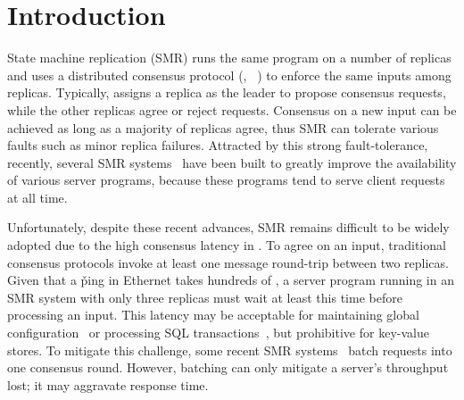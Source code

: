 \section{Introduction} \label{sec:intro}

State machine replication (SMR) runs the same program on a 
number of replicas and uses a distributed consensus protocol (\eg, 
\paxos~\cite{crane:sosp15}) to enforce the same inputs among 
replicas. Typically, \paxos assigns a replica as the leader to propose 
consensus requests, while the other replicas agree or reject requests. 
Consensus on a new input can be achieved as long as a majority of replicas 
agree, thus SMR can tolerate various faults such as minor replica 
failures. Attracted by this strong fault-tolerance, recently, several SMR 
systems~\cite{chubby:osdi, zookeeper, crane:sosp15, eve:osdi12, rex:eurosys14} 
have been built to greatly improve the availability of various server programs, 
because these programs tend to serve client requests at all time.

Unfortunately, despite these recent advances, SMR remains difficult to be 
widely adopted due to the high consensus latency in \paxos. To agree on an 
input, traditional consensus protocols invoke at least one message round-trip 
between two replicas. Given that a \v{ping} in Ethernet takes hundreds of \us, a 
server program running in an SMR system with only three replicas must wait at 
least this time before processing an input. This latency may be acceptable for 
maintaining global configuration~\cite{chubby:osdi,zookeeper} or processing SQL 
transactions~\cite{crane:sosp15,eve:osdi12}, but prohibitive for 
key-value stores. To mitigate this challenge, some recent SMR 
systems~\cite{calvin:sigmod12,rex:eurosys14} batch requests into one 
consensus round. However, batching can only mitigate a server's throughput 
lost; it may aggravate response time. 


